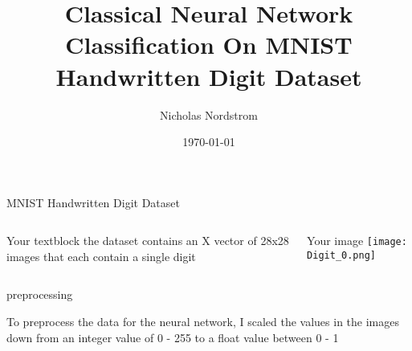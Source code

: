 \documentclass[12pt,oneside, letterpaper, draft]{beamer}
\title{Classical Neural Network Classification On MNIST Handwritten Digit Dataset}
\author{Nicholas Nordstrom}
\date{\today}
\begin{document}
\maketitle

\begin{frame}{ MNIST Handwritten Digit Dataset}

	\begin{columns}[T]
    \begin{column}{.5\textwidth}
     \begin{block}{Your textblock}
the dataset contains an X vector of 28x28 images that each contain a single digit
    \end{block}
    \end{column}
    \begin{column}{.5\textwidth}
    \begin{block}{Your image}
    \texttt{[image: Digit\_0.png]}
    \end{block}
    \end{column}
  \end{columns}
   
\end{frame}

\begin{frame}{preprocessing}

To preprocess the data for the neural network, I scaled the values in the images down from an integer value of 0 - 255 to a float value between 0 - 1

\end{frame}
\end{document}
